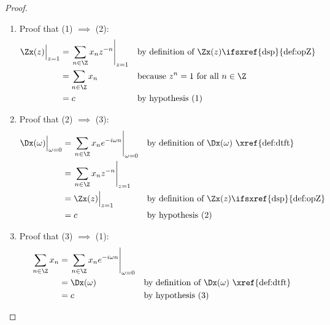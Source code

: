 \begin{proof}
\begin{enumerate}
  \item Proof that (1) $\implies$ (2):
    \begin{align*}
      \Zx(z)\Big|_{z=1}
        &= \left.\sum_{n\in\Z} x_n z^{-n} \right|_{z=1}
        && \text{by definition of $\Zx(z)$\ifsxref{dsp}{def:opZ}}
      \\&= \sum_{n\in\Z} x_n
        && \text{because $z^n=1$ for all $n\in\Z$}
      \\&= c
        && \text{by hypothesis (1)}
    \end{align*}


  \item Proof that (2) $\implies$ (3):
    \begin{align*}
      \Dx(\omega)\Big|_{\omega=0}
        &= \left.\sum_{n\in\Z} x_n e^{-i\omega n} \right|_{\omega=0}
        && \text{by definition of $\Dx(\omega)$ \xref{def:dtft}}
      \\&= \left.\sum_{n\in\Z} x_n z^{-n} \right|_{z=1}
      \\&= \Zx(z)\Big|_{z=1}
        && \text{by definition of $\Zx(z)$\ifsxref{dsp}{def:opZ}}
      \\&= c
        && \text{by hypothesis (2)}
    \end{align*}

  \item Proof that (3) $\implies$ (1):
    \begin{align*}
      \sum_{n\in\Z} x_n
        &= \left.\sum_{n\in\Z} x_n e^{-i\omega n} \right|_{\omega=0}
      \\&= \Dx(\omega)
        && \text{by definition of $\Dx(\omega)$ \xref{def:dtft}}
      \\&= c
        && \text{by hypothesis (3)}
    \end{align*}
\end{enumerate}
\end{proof}

